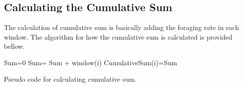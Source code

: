  \subsection{\label{Calculating the Cumulative Sum}Calculating the Cumulative Sum}
 The calculation of cumulative sum is basically adding the foraging rate in each window. The algorithm for how the cumulative sum is calculated is provided bellow.
 \begin{algorithm}[H]
 	\begin{algorithmic}[1]
 		\State Sum=0
 			\State Sum= Sum + window(i)
 			\State CumulativeSum(i)=Sum
 		\EndFor
 		\caption{Pseudo code for calculating cumulative sum.}
 		\label{Pseudo code for calculating cumulative sum.}
 	\end{algorithmic}
 \end{algorithm}